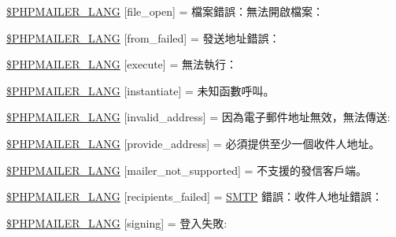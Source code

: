 \begin{DoxyCompactItemize}
\item 
\hyperlink{phpmailer_8lang-zh_8php_a28d1a6517bf4c942a0ddd506188ad2e0}{\$\+P\+H\+P\+M\+A\+I\+L\+E\+R\+\_\+\+L\+A\+NG} \mbox{[}\textquotesingle{}file\+\_\+open\textquotesingle{}\mbox{]} = \textquotesingle{}檔案錯誤：無法開啟檔案：\textquotesingle{}
\item 
\hyperlink{phpmailer_8lang-zh_8php_adf832ae12155a09be077c6d5e4fd7e22}{\$\+P\+H\+P\+M\+A\+I\+L\+E\+R\+\_\+\+L\+A\+NG} \mbox{[}\textquotesingle{}from\+\_\+failed\textquotesingle{}\mbox{]} = \textquotesingle{}發送地址錯誤：\textquotesingle{}
\item 
\hyperlink{phpmailer_8lang-zh_8php_a668217a9563a168f30f2a8548b6ed5a9}{\$\+P\+H\+P\+M\+A\+I\+L\+E\+R\+\_\+\+L\+A\+NG} \mbox{[}\textquotesingle{}execute\textquotesingle{}\mbox{]} = \textquotesingle{}無法執行：\textquotesingle{}
\item 
\hyperlink{phpmailer_8lang-zh_8php_ad58dde16780f4770ccf4dd282ea1f5ad}{\$\+P\+H\+P\+M\+A\+I\+L\+E\+R\+\_\+\+L\+A\+NG} \mbox{[}\textquotesingle{}instantiate\textquotesingle{}\mbox{]} = \textquotesingle{}未知函數呼叫。\textquotesingle{}
\item 
\hyperlink{phpmailer_8lang-zh_8php_a42d61bcea4c79599ecb44fd062f54d47}{\$\+P\+H\+P\+M\+A\+I\+L\+E\+R\+\_\+\+L\+A\+NG} \mbox{[}\textquotesingle{}invalid\+\_\+address\textquotesingle{}\mbox{]} = \textquotesingle{}因為電子郵件地址無效，無法傳送\+: \textquotesingle{}
\item 
\hyperlink{phpmailer_8lang-zh_8php_a8b97897c2406b7392b056f375feeefbb}{\$\+P\+H\+P\+M\+A\+I\+L\+E\+R\+\_\+\+L\+A\+NG} \mbox{[}\textquotesingle{}provide\+\_\+address\textquotesingle{}\mbox{]} = \textquotesingle{}必須提供至少一個收件人地址。\textquotesingle{}
\item 
\hyperlink{phpmailer_8lang-zh_8php_aa2ebcb8833ee83a7ad67401c4bb3a6ad}{\$\+P\+H\+P\+M\+A\+I\+L\+E\+R\+\_\+\+L\+A\+NG} \mbox{[}\textquotesingle{}mailer\+\_\+not\+\_\+supported\textquotesingle{}\mbox{]} = \textquotesingle{}不支援的發信客戶端。\textquotesingle{}
\item 
\hyperlink{phpmailer_8lang-zh_8php_a7589d30bb9b368327c2df015f3e6bcba}{\$\+P\+H\+P\+M\+A\+I\+L\+E\+R\+\_\+\+L\+A\+NG} \mbox{[}\textquotesingle{}recipients\+\_\+failed\textquotesingle{}\mbox{]} = \textquotesingle{}\hyperlink{class_s_m_t_p}{S\+M\+TP} 錯誤：收件人地址錯誤：\textquotesingle{}
\item 
\hyperlink{phpmailer_8lang-zh_8php_a68e437bdb9b968a5a67320f03d231565}{\$\+P\+H\+P\+M\+A\+I\+L\+E\+R\+\_\+\+L\+A\+NG} \mbox{[}\textquotesingle{}signing\textquotesingle{}\mbox{]} = \textquotesingle{}登入失敗\+: \textquotesingle{}

\end{DoxyCompactItemize}
